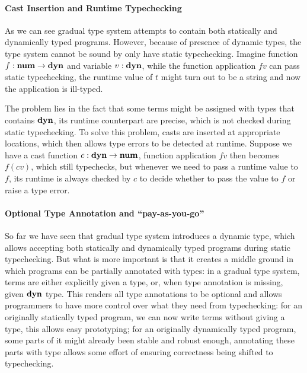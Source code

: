 \paragraph{Cast Insertion and Runtime Typechecking}

As we can see gradual type system attempts to contain both statically and dynamically typed programs.
However, because of presence of dynamic types,
the type system cannot be sound by only have static typechecking.
Imagine function $f : \textbf{num} \rightarrow \textbf{dyn}$ and variable $v : \textbf{dyn}$, while the function application
$f v$ can pass static typechecking, the runtime value of $t$ might turn out to be a string
and now the application is ill-typed.

The problem lies in the fact that some terms might be assigned with types that contains
$\textbf{dyn}$, its runtime counterpart are precise, which is not checked during static typechecking.
To solve this problem, casts are inserted at appropriate locations, which then
allows type errors to be detected at runtime.
Suppose we have a cast function $c : \textbf{dyn} \rightarrow \textbf{num}$, function application $f v$
then becomes $f (c v)$, which still typechecks, but whenever we need to pass a runtime value to $f$,
its runtime is always checked by $c$ to decide whether to pass the value to $f$ or raise
a type error.

\paragraph{Optional Type Annotation and ``pay-as-you-go''}

So far we have seen that gradual type system introduces a dynamic type,
which allows accepting both statically and dynamically typed programs during static typechecking.
But what is more important is that it creates a middle ground in which programs
can be partially annotated with types:
in a gradual type system, terms are either explicitly given a type,
or, when type annotation is missing, given $\textbf{dyn}$ type.
This renders all type annotations to be optional and allows programmers
to have more control over what they need from typechecking:
for an originally statically typed program, we can now write terms without giving a type,
this allows easy prototyping; for an originally dynamically typed program,
some parts of it might already been stable and robust enough, annotating these parts
with type allows some effort of ensuring correctness being shifted to typechecking.

